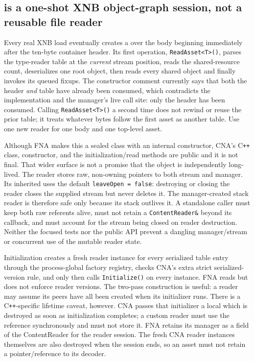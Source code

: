 \subsection{ is a one-shot XNB object-graph session, not a reusable file reader}
\label{sec:content-reader-contract}

Every real XNB load eventually creates a  over the body beginning
immediately after the ten-byte container header. Its first operation, \texttt{ReadAsset<T>()},
parses the type-reader table at the \emph{current} stream position, reads the shared-resource
count, deserializes one root object, then reads every shared object and finally invokes its
queued fixups. The constructor comment currently says that both the header \emph{and} table have
already been consumed, which contradicts the implementation and the manager's live call site:
only the header has been consumed. Calling \texttt{ReadAsset<T>()} a second time does not rewind
or reuse the prior table; it treats whatever bytes follow the first asset as another table.
Use one new reader for one body and one top-level asset.

Although FNA makes this a sealed class with an internal constructor, CNA's C\texttt{++} class,
constructor, and the initialization/read methods are public and it is not final. That wider
surface is not a promise that the object is independently long-lived. The reader stores raw,
non-owning pointers to both stream and manager. Its inherited  uses the
default \texttt{leaveOpen = false}: destroying or closing the reader closes the supplied stream
but never deletes it. The manager-created stack reader is therefore safe only because its stack
 outlives it. A standalone caller must keep both raw referents alive,
must not retain a \texttt{ContentReader\&} beyond its callback, and must account for the stream
being closed on reader destruction. Neither the focused tests nor the public API prevent a
dangling manager/stream or concurrent use of the mutable reader state.

Initialization creates a fresh reader instance for every serialized table entry through the
process-global factory registry, checks CNA's extra strict serialized-version rule, and only then
calls \texttt{Initialize()} on every instance. FNA reads but does not enforce reader versions.
The two-pass construction is useful: a reader may assume its peers have all been created when its
initializer runs. There is a C\texttt{++}-specific lifetime caveat, however. CNA passes that
initializer a local  which is destroyed as soon as
initialization completes; a custom reader must use the reference synchronously and must not store
it. FNA retains its manager as a field of the ContentReader for the reader session. The fresh CNA
reader instances themselves are also destroyed when the session ends, so an asset must not retain
a pointer/reference to its decoder.

